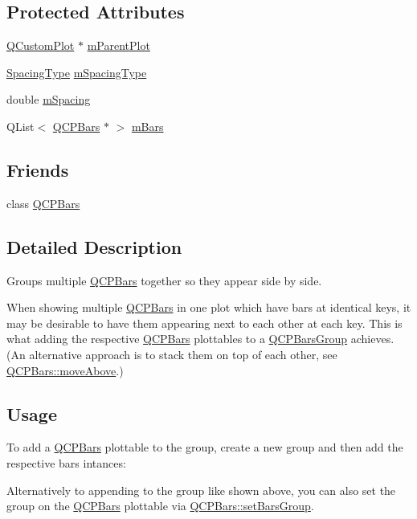 \subsection*{Protected Attributes}
\begin{DoxyCompactItemize}
\item 
\mbox{\hyperlink{class_q_custom_plot}{Q\+Custom\+Plot}} $\ast$ \mbox{\hyperlink{class_q_c_p_bars_group_a973d408cfbf88db95115aec71877f9e7}{m\+Parent\+Plot}}
\item 
\mbox{\hyperlink{class_q_c_p_bars_group_a4c0521120a97e60bbca37677a37075b6}{Spacing\+Type}} \mbox{\hyperlink{class_q_c_p_bars_group_a6794ee1a9c81864d627bff6a4b2d64ec}{m\+Spacing\+Type}}
\item 
double \mbox{\hyperlink{class_q_c_p_bars_group_a56471d7f548ca6141b7a5bf9629f7ece}{m\+Spacing}}
\item 
Q\+List$<$ \mbox{\hyperlink{class_q_c_p_bars}{Q\+C\+P\+Bars}} $\ast$ $>$ \mbox{\hyperlink{class_q_c_p_bars_group_affdb1e9233c277ff5a4c0a1121cf1fc0}{m\+Bars}}
\end{DoxyCompactItemize}
\subsection*{Friends}
\begin{DoxyCompactItemize}
\item 
class \mbox{\hyperlink{class_q_c_p_bars_group_a721b87c7cdb8e83a90d77fc8a22e7195}{Q\+C\+P\+Bars}}
\end{DoxyCompactItemize}


\subsection{Detailed Description}
Groups multiple \mbox{\hyperlink{class_q_c_p_bars}{Q\+C\+P\+Bars}} together so they appear side by side. 



When showing multiple \mbox{\hyperlink{class_q_c_p_bars}{Q\+C\+P\+Bars}} in one plot which have bars at identical keys, it may be desirable to have them appearing next to each other at each key. This is what adding the respective \mbox{\hyperlink{class_q_c_p_bars}{Q\+C\+P\+Bars}} plottables to a \mbox{\hyperlink{class_q_c_p_bars_group}{Q\+C\+P\+Bars\+Group}} achieves. (An alternative approach is to stack them on top of each other, see \mbox{\hyperlink{class_q_c_p_bars_ac22e00a6a41509538c21b04f0a57318c}{Q\+C\+P\+Bars\+::move\+Above}}.)\hypertarget{class_q_c_p_bars_group_qcpbarsgroup-usage}{}\subsection{Usage}\label{class_q_c_p_bars_group_qcpbarsgroup-usage}
To add a \mbox{\hyperlink{class_q_c_p_bars}{Q\+C\+P\+Bars}} plottable to the group, create a new group and then add the respective bars intances\+: 
\begin{DoxyCodeInclude}{0}
\end{DoxyCodeInclude}
Alternatively to appending to the group like shown above, you can also set the group on the \mbox{\hyperlink{class_q_c_p_bars}{Q\+C\+P\+Bars}} plottable via \mbox{\hyperlink{class_q_c_p_bars_aedd1709061f0b307c47ddb45e172ef9a}{Q\+C\+P\+Bars\+::set\+Bars\+Group}}.

